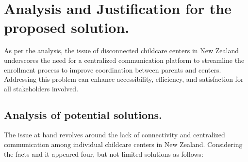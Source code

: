 \section{Analysis and Justification for the proposed solution.}
As per the analysis, the issue of disconnected childcare centers in New Zealand underscores the need for a centralized communication platform to streamline the enrollment process to improve coordination between parents and centers. Addressing this problem can enhance accessibility, efficiency, and satisfaction for all stakeholders involved. \par

\subsection{Analysis of potential solutions.}
The issue at hand revolves around the lack of connectivity and centralized communication among individual childcare centers in New Zealand. Considering the facts and it appeared four, but not limited solutions as follows: 
